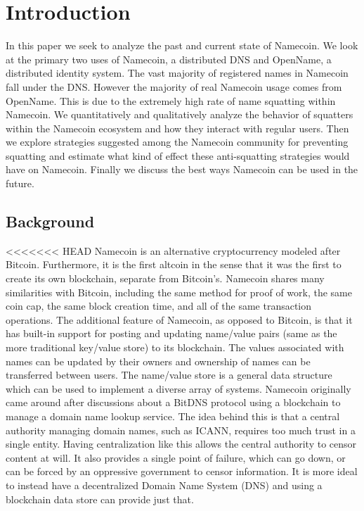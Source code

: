 \section{Introduction}
\label{sec:intro}

In this paper we seek to analyze the past and current state of Namecoin. We look at the primary two uses of Namecoin, a distributed DNS and OpenName, a distributed identity system. The vast majority of registered names in Namecoin fall under the DNS. However the  majority of real Namecoin usage comes from OpenName. This is due to the extremely high rate of name squatting within Namecoin. We quantitatively and qualitatively analyze the behavior of squatters within the Namecoin ecosystem and how they interact with regular users. Then we explore strategies suggested among the Namecoin community for preventing squatting and estimate what kind of effect these anti-squatting strategies would have on Namecoin. Finally we discuss the best ways Namecoin can be used in the future.

\subsection{Background}
<<<<<<< HEAD
Namecoin is an alternative cryptocurrency modeled after Bitcoin. Furthermore, it is the first altcoin in the sense that it was the first to create its own blockchain, separate from Bitcoin's. Namecoin shares many similarities with Bitcoin, including the same method for proof of work, the same coin cap, the same block creation time, and all of the same transaction operations. The additional feature of Namecoin, as opposed to Bitcoin, is that it has built-in support for posting and updating name/value pairs (same as the more traditional key/value store) to its blockchain. The values associated with names can be updated by their owners and ownership of names can be transferred between users. The name/value store is a general data structure which can be used to implement a diverse array of systems. Namecoin originally came around after discussions about a BitDNS protocol using a blockchain to manage a domain name lookup service. The idea behind this is that a central authority managing domain names, such as ICANN, requires too much trust in a single entity. Having centralization like this allows the central authority to censor content at will. It also provides a single point of failure, which can go down, or can be forced by an oppressive government to censor information. It is more ideal to instead have a decentralized Domain Name System (DNS) and using a blockchain data store can provide just that.

